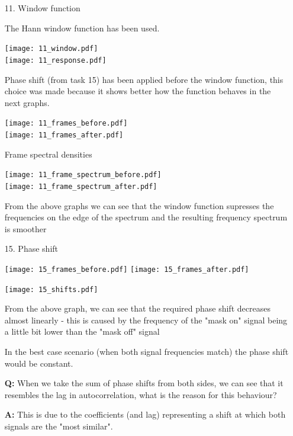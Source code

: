 \documentclass[a4paper, 11pt]{article}
\begin{document}
    \begin{enumerate}
        \item[11.]
        Window function

        The Hann window function has been used.

        \texttt{[image: 11\_window.pdf]} \\
        \texttt{[image: 11\_response.pdf]}

        Phase shift (from task 15) has been applied before the window function,
        this choice was made because it shows better how the function behaves in the next graphs.

        \texttt{[image: 11\_frames\_before.pdf]} \\
        \texttt{[image: 11\_frames\_after.pdf]}

        \newpage
        Frame spectral densities

        \texttt{[image: 11\_frame\_spectrum\_before.pdf]} \\
        \texttt{[image: 11\_frame\_spectrum\_after.pdf]}

        From the above graphs we can see that the window function
        supresses the frequencies on the edge of the spectrum and the resulting frequency spectrum is smoother

        \newpage
        \item[15.]
        Phase shift

        \texttt{[image: 15\_frames\_before.pdf]}
        \texttt{[image: 15\_frames\_after.pdf]}

        \texttt{[image: 15\_shifts.pdf]}

        From the above graph, we can see that the required phase shift decreases almost linearly -
        this is caused by the frequency of the "mask on" signal being a little bit lower than the "mask off" signal

        In the best case scenario (when both signal frequencies match) the phase shift would be constant.

        \vspace{6mm}

        \textbf{Q:} When we take the sum of phase shifts from both sides,
        we can see that it resembles the lag in autocorrelation,
        what is the reason for this behaviour?

        \textbf{A:} This is due to the coefficients (and lag) representing a shift at which both signals are the "most similar".


\end{enumerate}
\end{document}
